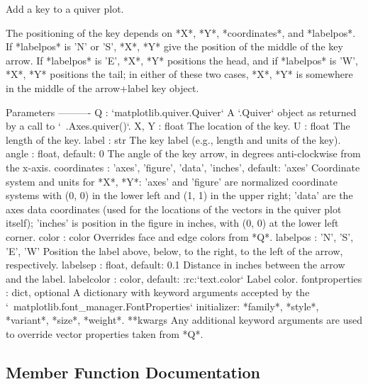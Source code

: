 \begin{DoxyVerb}Add a key to a quiver plot.

The positioning of the key depends on *X*, *Y*, *coordinates*, and
*labelpos*.  If *labelpos* is 'N' or 'S', *X*, *Y* give the position of
the middle of the key arrow.  If *labelpos* is 'E', *X*, *Y* positions
the head, and if *labelpos* is 'W', *X*, *Y* positions the tail; in
either of these two cases, *X*, *Y* is somewhere in the middle of the
arrow+label key object.

Parameters
----------
Q : `matplotlib.quiver.Quiver`
    A `.Quiver` object as returned by a call to `~.Axes.quiver()`.
X, Y : float
    The location of the key.
U : float
    The length of the key.
label : str
    The key label (e.g., length and units of the key).
angle : float, default: 0
    The angle of the key arrow, in degrees anti-clockwise from the
    x-axis.
coordinates : {'axes', 'figure', 'data', 'inches'}, default: 'axes'
    Coordinate system and units for *X*, *Y*: 'axes' and 'figure' are
    normalized coordinate systems with (0, 0) in the lower left and
    (1, 1) in the upper right; 'data' are the axes data coordinates
    (used for the locations of the vectors in the quiver plot itself);
    'inches' is position in the figure in inches, with (0, 0) at the
    lower left corner.
color : color
    Overrides face and edge colors from *Q*.
labelpos : {'N', 'S', 'E', 'W'}
    Position the label above, below, to the right, to the left of the
    arrow, respectively.
labelsep : float, default: 0.1
    Distance in inches between the arrow and the label.
labelcolor : color, default: :rc:`text.color`
    Label color.
fontproperties : dict, optional
    A dictionary with keyword arguments accepted by the
    `~matplotlib.font_manager.FontProperties` initializer:
    *family*, *style*, *variant*, *size*, *weight*.
**kwargs
    Any additional keyword arguments are used to override vector
    properties taken from *Q*.
\end{DoxyVerb}
 

\subsection{Member Function Documentation}
\mbox{\label{classmatplotlib_1_1quiver_1_1QuiverKey_a419f26dc3938261d1d42e6f857d749b8}} 
